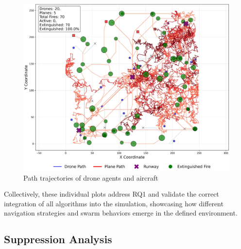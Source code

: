 \documentclass[11pt, a4paper]{article}
\begin{document}
\begin{figure}[htbp]
    \centering
    \includegraphics[width=1\linewidth]{figures/Hybrid_agent_paths.jpeg}
    \caption{Path trajectories of drone agents and aircraft}
    \label{fig:hybrid_path}
\end{figure}

Collectively, these individual plots address RQ1 and validate the correct integration of all algorithms into the simulation, showcasing how different navigation strategies and swarm behaviors emerge in the defined environment. 


\subsection{Suppression Analysis}
\label{sec:supression_analysis}
\end{document}
